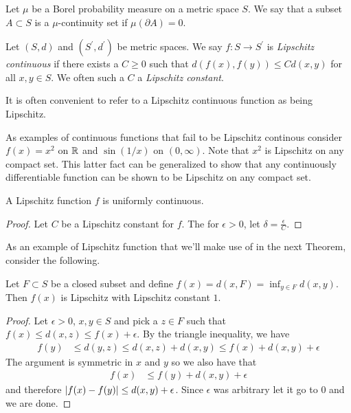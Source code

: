 \begin{defn}Let $\mu$ be a Borel probability measure on a metric space
  $S$.  We say that a subset $A \subset S$ is a $\mu$-continuity set
  if $\mu(\partial A) = 0$.
\end{defn}

\begin{defn}Let $(S,d)$ and $(S^\prime,d^\prime)$ be metric spaces.
  We say $f : S \to S^\prime$ is \emph{Lipschitz continuous} if there
  exists a $C \geq 0$ such that $d(f(x), f(y)) \leq C d(x,y)$ for all
  $x,y \in S$.  We often such a $C$ a \emph{Lipschitz constant}.  
\end{defn}
It is often convenient to refer to a Lipschitz continuous function as
being Lipschitz.
\begin{examp}As examples of continuous functions that fail to be Lipschitz
  continous consider $f(x) = x^2$ on $\mathbb{R}$ and $\sin(1/x)$ on $(0,
  \infty)$.  Note that $x^2$ is Lipschitz on any compact set.  This
  latter fact can be generalized to show that any continuously
  differentiable function can be shown to be Lipschitz on any compact set.
\end{examp}
\begin{lem}A Lipschitz function $f$ is uniformly continuous.
\end{lem}
\begin{proof}Let $C$ be a Lipschitz constant for $f$.  The for
  $\epsilon > 0$, let $\delta = \frac{\epsilon}{C}$.
\end{proof}
As an example of Lipschitz function that we'll make use of in the next
Theorem, consider the following.
\begin{lem}\label{DistanceToSetLipschitz}Let $F \subset S$ be a closed subset and define $f(x) =
  d(x, F) = \inf_{y \in F} d(x,y)$.  Then $f(x)$ is Lipschitz with
  Lipschitz constant $1$.
\end{lem}
\begin{proof}
Let $\epsilon > 0$, $x,y \in S$ and pick a $z \in F$ such that $f(x)
\leq d(x,z) \leq f(x) + \epsilon$.  By the triangle inequality, we
have
\begin{align*}
f(y) &\leq d(y,z) \leq d(x,z) + d(x,y) \leq f(x) + d(x,y) + \epsilon
\end{align*}
The argument is symmetric in $x$ and $y$ so we also have that
\begin{align*}
f(x) &\leq  f(y) + d(x,y) + \epsilon
\end{align*}
and therefore $\left \vert f(x) - f(y) \right \vert \leq d(x,y) + \epsilon$.
Since $\epsilon$ was arbitrary let it go to $0$ and we are done.
\end{proof}


